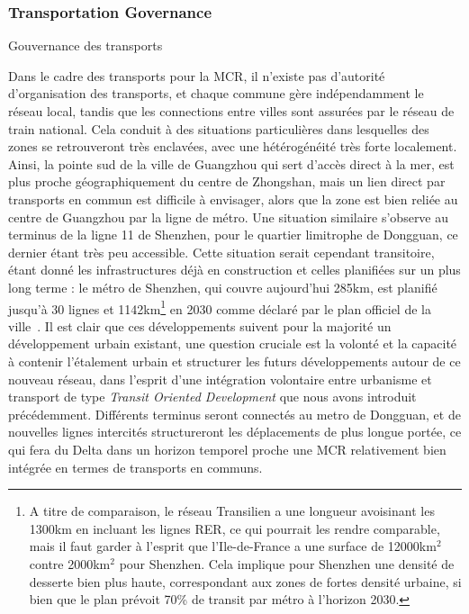 \subsubsection{Transportation Governance}{Gouvernance des transports}

\bpar{}
{
 Dans le cadre des transports pour la MCR, il n'existe pas d'autorité d'organisation des transports, et chaque commune gère indépendamment le réseau local, tandis que les connections entre villes sont assurées par le réseau de train national. Cela conduit à des situations particulières dans lesquelles des zones se retrouveront très enclavées, avec une hétérogénéité très forte localement. Ainsi, la pointe sud de la ville de Guangzhou qui sert d'accès direct à la mer, est plus proche géographiquement du centre de Zhongshan, mais un lien direct par transports en commun est difficile à envisager, alors que la zone est bien reliée au centre de Guangzhou par la ligne de métro. Une situation similaire s'observe au terminus de la ligne 11 de Shenzhen, pour le quartier limitrophe de Dongguan, ce dernier étant très peu accessible. Cette situation serait cependant transitoire, étant donné les infrastructures déjà en construction et celles planifiées sur un plus long terme : le métro de Shenzhen, qui couvre aujourd'hui 285km, est planifié jusqu'à 30 lignes et 1142km\footnote{A titre de comparaison, le réseau Transilien a une longueur avoisinant les 1300km en incluant les lignes RER, ce qui pourrait les rendre comparable, mais il faut garder à l'esprit que l'Ile-de-France a une surface de 12000km$^2$ contre 2000km$^2$ pour Shenzhen. Cela implique pour Shenzhen une densité de desserte bien plus haute, correspondant aux zones de fortes densité urbaine, si bien que le plan prévoit 70\% de transit par métro à l'horizon 2030.} en 2030 comme déclaré par le plan officiel de la ville~\cite{shenzhen2016plan}. Il est clair que ces développements suivent pour la majorité un développement urbain existant, une question cruciale est la volonté et la capacité à contenir l'étalement urbain et structurer les futurs développements autour de ce nouveau réseau, dans l'esprit d'une intégration volontaire entre urbanisme et transport de type \emph{Transit Oriented Development} que nous avons introduit précédemment. Différents terminus seront connectés au metro de Dongguan, et de nouvelles lignes intercités structureront les déplacements de plus longue portée, ce qui fera du Delta dans un horizon temporel proche une MCR relativement bien intégrée en termes de transports en communs.
}


